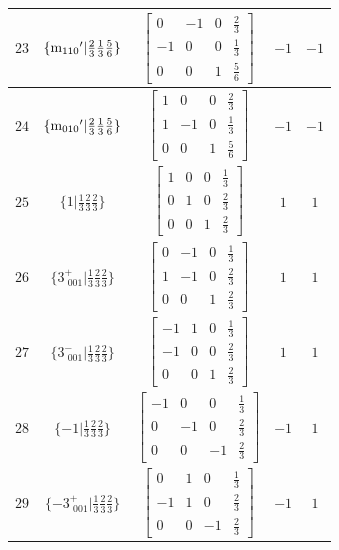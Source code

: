 \documentclass[fleqn,8pt]{jsarticle}
\begin{document}
\begin{longtable}{ccccc}
$ 23 $ & $ \{{\rm m}_{110}{}'|\frac{2}{3} \frac{1}{3} \frac{5}{6}\} $ & $ \begin{bmatrix} 0 & -1 & 0 & \frac{2}{3} \\ -1 & 0 & 0 & \frac{1}{3} \\ 0 & 0 & 1 & \frac{5}{6} \end{bmatrix} $ & $ -1 $ & $ -1 $ \\ \hline
$ 24 $ & $ \{{\rm m}_{010}{}'|\frac{2}{3} \frac{1}{3} \frac{5}{6}\} $ & $ \begin{bmatrix} 1 & 0 & 0 & \frac{2}{3} \\ 1 & -1 & 0 & \frac{1}{3} \\ 0 & 0 & 1 & \frac{5}{6} \end{bmatrix} $ & $ -1 $ & $ -1 $ \\ \hline
$ 25 $ & $ \{1|\frac{1}{3} \frac{2}{3} \frac{2}{3}\} $ & $ \begin{bmatrix} 1 & 0 & 0 & \frac{1}{3} \\ 0 & 1 & 0 & \frac{2}{3} \\ 0 & 0 & 1 & \frac{2}{3} \end{bmatrix} $ & $ 1 $ & $ 1 $ \\ \hline
$ 26 $ & $ \{3^{+}_{\,\,001}|\frac{1}{3} \frac{2}{3} \frac{2}{3}\} $ & $ \begin{bmatrix} 0 & -1 & 0 & \frac{1}{3} \\ 1 & -1 & 0 & \frac{2}{3} \\ 0 & 0 & 1 & \frac{2}{3} \end{bmatrix} $ & $ 1 $ & $ 1 $ \\ \hline
$ 27 $ & $ \{3^{-}_{\,\,001}|\frac{1}{3} \frac{2}{3} \frac{2}{3}\} $ & $ \begin{bmatrix} -1 & 1 & 0 & \frac{1}{3} \\ -1 & 0 & 0 & \frac{2}{3} \\ 0 & 0 & 1 & \frac{2}{3} \end{bmatrix} $ & $ 1 $ & $ 1 $ \\ \hline
$ 28 $ & $ \{-1|\frac{1}{3} \frac{2}{3} \frac{2}{3}\} $ & $ \begin{bmatrix} -1 & 0 & 0 & \frac{1}{3} \\ 0 & -1 & 0 & \frac{2}{3} \\ 0 & 0 & -1 & \frac{2}{3} \end{bmatrix} $ & $ -1 $ & $ 1 $ \\ \hline
$ 29 $ & $ \{-3^{+}_{\,\,001}|\frac{1}{3} \frac{2}{3} \frac{2}{3}\} $ & $ \begin{bmatrix} 0 & 1 & 0 & \frac{1}{3} \\ -1 & 1 & 0 & \frac{2}{3} \\ 0 & 0 & -1 & \frac{2}{3} \end{bmatrix} $ & $ -1 $ & $ 1 $ \\ \hline

\end{longtable}
\end{document}
